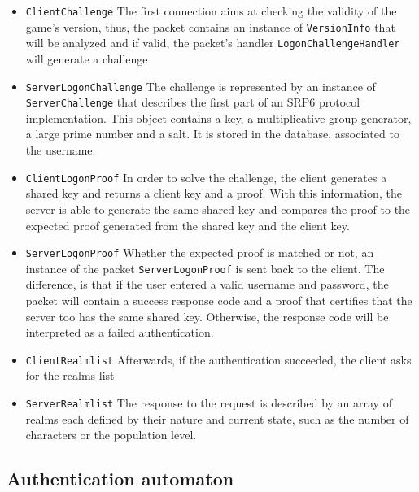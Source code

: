 \documentclass[paper=a4, fontsize=11pt]{scrartcl}
\begin{document}
\begin{itemize}
    \item \texttt{ClientChallenge}
        The first connection aims at checking the validity of the game's version, 
        thus, the packet contains an instance of \texttt{VersionInfo} that will 
        be analyzed and if valid, the packet's handler
        \texttt{LogonChallengeHandler} will generate a challenge

    \item \texttt{ServerLogonChallenge}
        The challenge is represented by an instance of \texttt{ServerChallenge}
        that describes the first part of an SRP6 protocol implementation. This
        object contains a key, a multiplicative group generator, a large
        prime number and a salt. It is stored in the database, associated to the
        username.

    \item \texttt{ClientLogonProof}
        In order to solve the challenge, the client generates a shared key and
        returns a client key and a proof. With this information, the server is
        able to generate the same shared key and compares the proof to the
        expected proof generated from the shared key and the client key. 

    \item \texttt{ServerLogonProof}
        Whether the expected proof is matched or not, an instance of the packet 
        \texttt{ServerLogonProof} is sent back to the client. The difference, 
        is that if the user entered a valid username and password, the packet 
        will contain a success response code and a proof that certifies that the 
        server too has the same shared key. Otherwise, the response code will be 
        interpreted as a failed authentication.

    \item \texttt{ClientRealmlist}
        Afterwards, if the authentication succeeded, the client asks for the
        realms list

    \item \texttt{ServerRealmlist}
        The response to the request is described by an array of realms each
        defined by their nature and current state, such as the number of
        characters or the population level.

\end{itemize}

\FloatBarrier{}

\subsection{Authentication automaton}
\end{document}

